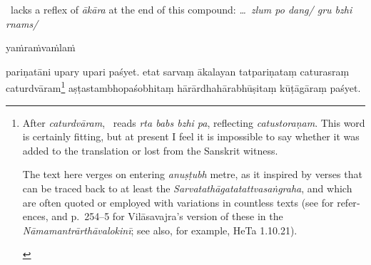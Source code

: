 \documentclass[naipra.tex]{subfiles}
\begin{document}
\begin{sanskrit}
{	\TIB\ lacks a reflex of \emph{ākāra} at the end of this compound: \emph{\ldots\ zlum po dang/ gru bzhi rnams/}
} \begin{mantra}yaṁ\dsh raṁ\dsh vaṁ\dsh laṁ\dsh \end{mantra}pariṇatāni upary upari paśyet. 
etat sarvaṃ  ākalayan tatpariṇataṃ caturasraṃ caturdvāram\footnote{\begin{english}
	After \emph{caturdvāram}, \TIB\ reads \emph{rta babs bzhi pa}, reflecting \emph{catustoraṇam}.
	This word is certainly fitting, but at present I feel it is impossible to say whether it was added to the translation or lost from the Sanskrit witness.

	The text here verges on entering \emph{anuṣṭubh} metre, as it inspired by verses that can be traced back to at least the \emph{Sarvatathāgatatattvasaṅgraha}, and which are often quoted or employed with variations in countless texts (see \cite[143 n.\ 24]{tribe2016} for references, and p.\ 254–5 for Vilāsavajra's version of these in the \emph{Nāmamantrārthāvalokinī}; see also, for example, HeTa 1.10.21).
\end{english}} aṣṭastambhopaśobhitaṃ hārārdhahārabhūṣitaṃ kūṭāgāraṃ paśyet. 
\pend




\end{sanskrit}
\end{document}
